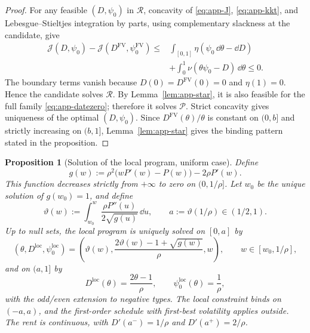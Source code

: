 \documentclass[12pt]{article}
\newtheorem{prop}{Proposition}
\begin{document}
\begin{proof}
For any feasible \((D,\psi_0)\) in \(\mathcal R\), concavity of
\eqref{eq:app-J}, \eqref{eq:app-kkt}, and Lebesgue--Stieltjes integration
by parts, using complementary slackness at the candidate, give
\begin{align*}
  \mathcal J(D,\psi_0)
  -\mathcal J(D^{\mathrm{FV}},\psi_0^{\mathrm{FV}})
  \leq{}&
  \int_{[0,1]}\eta(\psi_0\,\dd\theta-\dd D)\\
  &+\int_0^1\nu(\theta\psi_0-D)\,\dd\theta
  \leq0.
\end{align*}
The boundary terms vanish because \(D(0)=D^{\mathrm{FV}}(0)=0\) and
\(\eta(1)=0\). Hence the candidate solves \(\mathcal R\). By
Lemma~\ref{lem:app-star}, it is also feasible for the full family
\eqref{eq:app-datezero}; therefore it solves \(\mathcal P\). Strict
concavity gives uniqueness of the optimal $(D,\psi_0)$. Since
\(D^{\mathrm{FV}}(\theta)/\theta\) is constant on \((0,b]\) and strictly increasing
on \((b,1]\), Lemma~\ref{lem:app-star} gives the binding pattern stated in
the proposition.
\end{proof}

\begin{prop}[Solution of the local program, uniform case]
\label{prop:app-loc-structure}
Define
\[
  g(w):=\rho^2\bigl(wP'(w)-P(w)\bigr)-2\rho P'(w).
\]
This function decreases strictly from \(+\infty\) to zero on
\((0,1/\rho]\). Let \(w_0\) be the unique solution of \(g(w_0)=1\), and
define
\[
  \vartheta(w):=
  \int_{w_0}^w\frac{\rho P''(u)}{2\sqrt{g(u)}}\,\dd u,
  \qquad
  a:=\vartheta(1/\rho)\in(1/2,1).
\]
Up to null sets, the local program is uniquely solved on \([0,a]\) by
\[
  (\theta,D^{\mathrm{loc}},\psi_0^{\mathrm{loc}})
  =\left(\vartheta(w),
    \frac{2\vartheta(w)-1+\sqrt{g(w)}}{\rho},w\right),
  \qquad w\in[w_0,1/\rho],
\]
and on \((a,1]\) by
\[
  D^{\mathrm{loc}}(\theta)=\frac{2\theta-1}{\rho},
  \qquad
  \psi_0^{\mathrm{loc}}(\theta)=\frac1\rho,
\]
with the odd/even extension to negative types. The local constraint binds
on \((-a,a)\), and the first-order schedule with first-best volatility applies
outside. The rent is continuous, with \(D'(a^-)=1/\rho\) and
\(D'(a^+)=2/\rho\). %
\end{prop}
\end{document}
